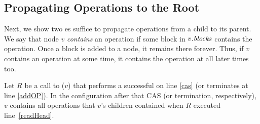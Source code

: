 \subsection{Propagating Operations to the Root}
Next, we show two es suffice to propagate operations from a child to its parent.
We say that node $v$ \emph{contains} an operation if some block in $v.\mbox{\textit{blocks}}$ contains the operation.
Once a block is added to a node, it remains there forever.  Thus, if $v$ contains an operation at some time, it contains the operation at all later times too.

\begin{lemma}\label{successfulRefresh}
Let $R$ be a call to ($v$) that performs a successful  on line \ref{cas} (or terminates at line \ref{addOP}).
In the configuration after that CAS (or termination, respectively), $v$ contains all operations that $v$'s children contained 
when $R$ executed line~\ref{readHead}.
\end{lemma}
